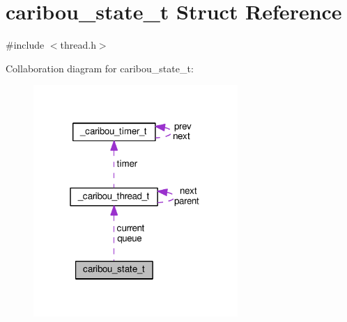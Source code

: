 \hypertarget{structcaribou__state__t}{\section{caribou\-\_\-state\-\_\-t Struct Reference}
\label{structcaribou__state__t}
}


{\ttfamily \#include $<$thread.\-h$>$}



Collaboration diagram for caribou\-\_\-state\-\_\-t\-:
\nopagebreak
\begin{figure}[H]
\begin{center}
\leavevmode
\includegraphics[width=220pt]{structcaribou__state__t__coll__graph}
\end{center}
\end{figure}
